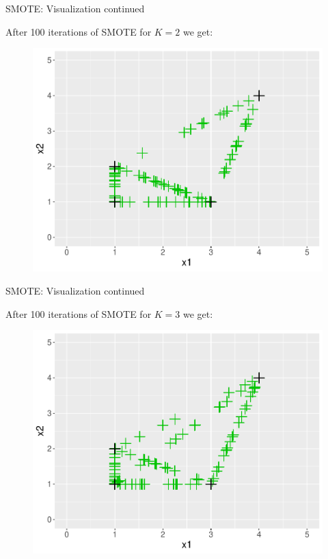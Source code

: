 \documentclass[11pt,compress,t,notes=noshow, xcolor=table]{beamer}
\begin{document}
\begin{frame}{SMOTE: Visualization continued}

    After 100 iterations of SMOTE for $K=2$ we get:		

    \begin{figure}
        \centering
        \includegraphics[width=0.8\linewidth]{figure_man/smote_viz_11.pdf}
    \end{figure}

\end{frame}

\begin{frame}{SMOTE: Visualization continued}	

    After 100 iterations of SMOTE for $K=3$ we get:		

    \begin{figure}
        \centering
        \includegraphics[width=0.8\linewidth]{figure_man/smote_viz_12.pdf}
    \end{figure}
	
\end{frame}
    
\end{document}
